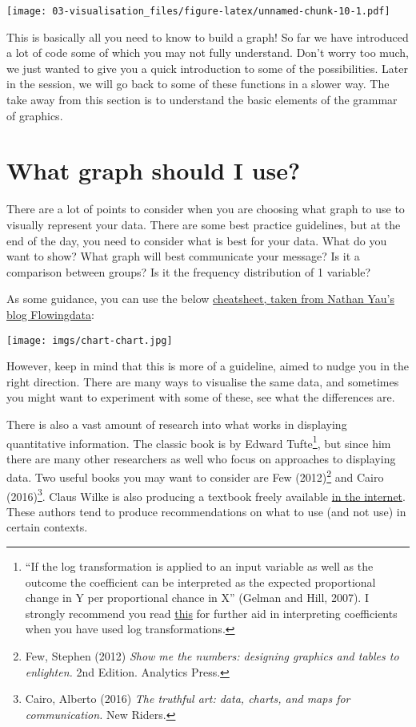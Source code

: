 \documentclass[
]{book}
\begin{document}
\texttt{[image: 03-visualisation\_files/figure-latex/unnamed-chunk-10-1.pdf]}

This is basically all you need to know to build a graph! So far we have introduced a lot of code some of which you may not fully understand. Don't worry too much, we just wanted to give you a quick introduction to some of the possibilities. Later in the session, we will go back to some of these functions in a slower way. The take away from this section is to understand the basic elements of the grammar of graphics.

\section{What graph should I use?}\label{what-graph-should-i-use}

There are a lot of points to consider when you are choosing what graph to use to visually represent your data. There are some best practice guidelines, but at the end of the day, you need to consider what is best for your data. What do you want to show? What graph will best communicate your message? Is it a comparison between groups? Is it the frequency distribution of 1 variable?

As some guidance, you can use the below \href{https://flowingdata.com/2009/01/15/flow-chart-shows-you-what-chart-to-use/}{cheatsheet, taken from Nathan Yau's blog Flowingdata}:

\texttt{[image: imgs/chart-chart.jpg]}

However, keep in mind that this is more of a guideline, aimed to nudge you in the right direction. There are many ways to visualise the same data, and sometimes you might want to experiment with some of these, see what the differences are.

There is also a vast amount of research into what works in displaying quantitative information. The classic book is by Edward Tufte\footnote{``If the log transformation is applied to an input variable as well as the outcome the coefficient can be interpreted as the expected proportional change in Y per proportional chance in X'' (Gelman and Hill, 2007). I strongly recommend you read \href{https://stats.oarc.ucla.edu/sas/faq/how-can-i-interpret-log-transformed-variables-in-terms-of-percent-change-in-linear-regression/}{this} for further aid in interpreting coefficients when you have used log transformations.}, but since him there are many other researchers as well who focus on approaches to displaying data. Two useful books you may want to consider are Few (2012)\footnote{Few, Stephen (2012) \emph{Show me the numbers: designing graphics and tables to enlighten.} 2nd Edition. Analytics Press.} and Cairo (2016)\footnote{Cairo, Alberto (2016) \emph{The truthful art: data, charts, and maps for communication.} New Riders.}. Claus Wilke is also producing a textbook freely available \href{https://serialmentor.com/dataviz/}{in the internet}.
These authors tend to produce recommendations on what to use (and not use) in certain contexts.
\end{document}
